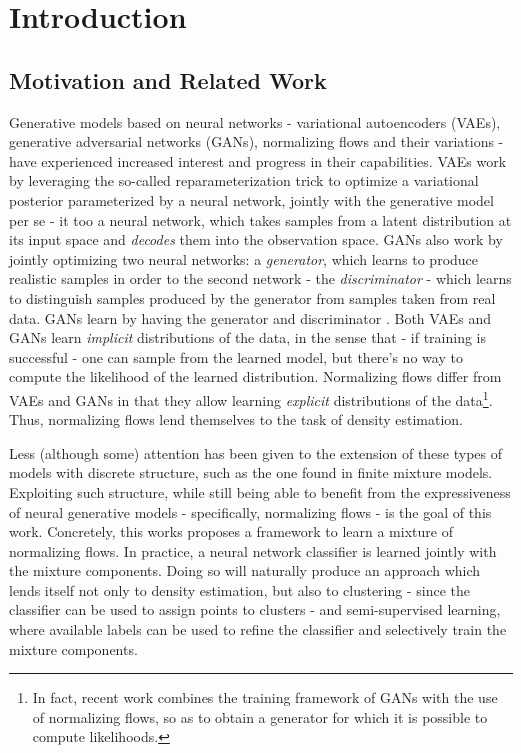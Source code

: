 \chapter{Introduction}
\label{chapter:introduction}

\section{Motivation and Related Work}
\label{section:motivation}

Generative models based on neural networks - variational autoencoders (VAEs),
generative adversarial networks (GANs), normalizing flows and their variations -
have experienced increased interest and progress in their capabilities. VAEs
\autocite{vaepaper} work by leveraging the so-called reparameterization trick to optimize
a variational posterior parameterized by a neural network, jointly with the generative
model per se - it too a neural network, which takes samples from a latent distribution at its
input space and \emph{decodes} them into the observation space. GANs also work by
jointly optimizing two neural networks: a \emph{generator}, which learns to produce
realistic samples in order to  the second network - the \emph{discriminator} - which
learns to distinguish samples produced by the generator from samples taken from real data. GANs learn
by having the generator and discriminator . Both VAEs and GANs learn
\emph{implicit} distributions of the data, in the sense that - if training is
successful - one can sample from the learned model, but there's no way to compute
the likelihood of the learned distribution. Normalizing flows differ from VAEs
and GANs in that they allow learning \emph{explicit} distributions of the
data\footnote{In fact, recent work \autocite{flowgan} combines the training
framework of GANs with the use of normalizing flows, so as to obtain a generator
for which it is possible to compute likelihoods.}. Thus, normalizing flows lend
themselves to the task of density estimation.

Less (although some) attention has been given to the extension of these types
of models with discrete structure, such as the one found in finite mixture models.
Exploiting such structure, while still being able to benefit from the expressiveness
of neural generative models - specifically, normalizing flows - is the goal of this
work. Concretely, this works proposes a framework to learn a mixture of normalizing
flows. In practice, a neural network classifier is learned jointly with the mixture
components. Doing so will naturally produce an approach which lends itself not
only to density estimation, but also to clustering - since the classifier can be used
to assign points to clusters - and semi-supervised learning, where available
labels can be used to refine the classifier and selectively train the mixture
components.

